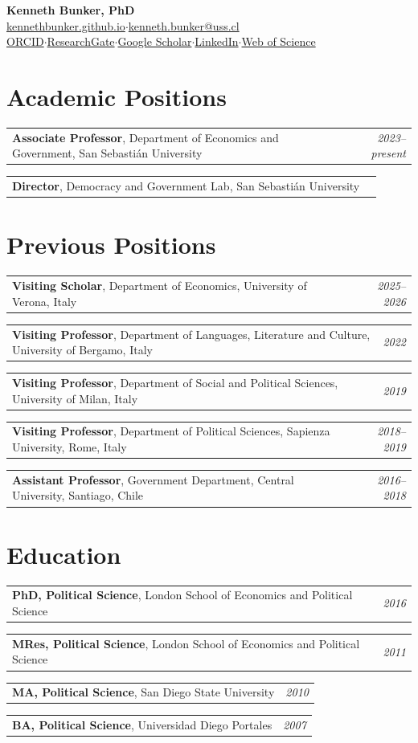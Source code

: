 \documentclass[11pt,letterpaper]{article}
\makeatletter
\newif\ifafterhead
\newlength{\entrygap}\setlength{\entrygap}{8.5pt}
\newcommand{\gap}{\ifafterhead\global\afterheadfalse\else\vspace{\entrygap}\fi}
\newcommand{\dated}[2]{\par\gap\noindent\begin{tabularx}{\linewidth}{@{}X@{\hspace{6pt}}r@{}}#1 & \textit{#2}\end{tabularx}\par}
\newcommand{\sep}{\hspace{8pt}$\cdot$\hspace{5pt}}
\makeatother
\begin{document}
{\centering
{\Huge\bfseries Kenneth Bunker, PhD}\\[4pt]
{\small \href{https://kennethbunker.github.io}{kennethbunker.github.io}\sep{}\href{mailto:kenneth.bunker@uss.cl}{kenneth.bunker@uss.cl}}\\[2pt]
{\small \href{https://orcid.org/0000-0002-4579-6132}{ORCID}\sep{}\href{http://www.researcherid.com/rid/R-4439-2018}{ResearchGate}\sep{}\href{https://scholar.google.cl/citations?user=kFHaW6wAAAAJ}{Google Scholar}\sep{}\href{https://cl.linkedin.com/in/kennethbunker}{LinkedIn}\sep{}\href{https://www.webofscience.com/wos/author/record/168642}{Web of Science}}
\par}
\vspace{-8pt}

\section{Academic Positions}
\dated{\textbf{Associate Professor}, Department of Economics and Government, San Sebastián University}{2023--present}
\dated{\textbf{Director}, Democracy and Government Lab, San Sebastián University}{}

\section{Previous Positions}
\dated{\textbf{Visiting Scholar}, Department of Economics, University of Verona, Italy}{2025--2026}
\dated{\textbf{Visiting Professor}, Department of Languages, Literature and Culture, University of Bergamo, Italy}{2022}
\dated{\textbf{Visiting Professor}, Department of Social and Political Sciences, University of Milan, Italy}{2019}
\dated{\textbf{Visiting Professor}, Department of Political Sciences, Sapienza University, Rome, Italy}{2018--2019}
\dated{\textbf{Assistant Professor}, Government Department, Central University, Santiago, Chile}{2016--2018}

\section{Education}
\dated{\textbf{PhD, Political Science}, London School of Economics and Political Science}{2016}
\dated{\textbf{MRes, Political Science}, London School of Economics and Political Science}{2011}
\dated{\textbf{MA, Political Science}, San Diego State University}{2010}
\dated{\textbf{BA, Political Science}, Universidad Diego Portales}{2007}
\end{document}
